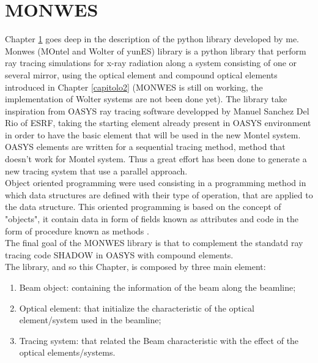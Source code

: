 \chapter{MONWES}
\label{capitolo3}
\thispagestyle{empty}
\vspace{0.5cm}

Chapter \ref{capitolo3} goes deep in the description of the python library developed by me. Monwes (MOntel and Wolter of yunES) library is a python library that perform ray tracing simulations for x-ray radiation along a system consisting of one or several mirror, using the optical element and compound optical elements introduced in Chapter \ref{capitolo2} (MONWES is still on working, the implementation of Wolter systems are not been done yet). The library take inspiration from OASYS ray tracing software developped by Manuel Sanchez Del Rio of ESRF, taking the starting element already present in OASYS environment in order to have the basic element that will be used in the new Montel system. OASYS elements are written for a sequential tracing method, method that doesn't work for Montel system. Thus a great effort has been done to generate a new tracing system that use a parallel approach.
\\
Object oriented programming were used consisting in a programming method in which data structures are defined with their type of operation, that are applied to the data structure. This oriented programming is based on the concept of "objects", it contain data in form of fields known as attributes and code in the form of procedure known as methods \cite{gamma2001design}. 
\\
The final goal of the MONWES library is that to complement the standatd ray tracing code SHADOW in OASYS with compound elements.
\\
The library, and so this Chapter, is composed by three main element:
\begin{enumerate}
\item Beam object: containing the information of the beam along the beamline;
\item Optical element: that initialize the characteristic of the optical element/system used in the beamline;
\item Tracing system: that  related the Beam characteristic with the effect of the optical elements/systems.
\end{enumerate}

\vspace{0.5cm}

